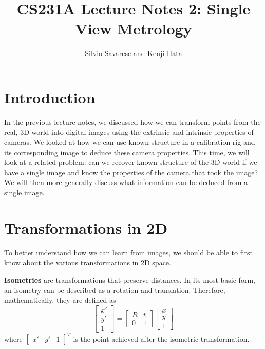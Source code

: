 \documentclass[a4paper, 12pt]{article}
\title{CS231A Lecture Notes 2: Single View Metrology}
\author{Silvio Savarese and Kenji Hata}
\date{}
\renewcommand\emph{\textbf}
\begin{document}
\maketitle

\section{Introduction}
In the previous lecture notes, we discussed how we can transform points from the real, 3D world into digital images using the extrinsic and intrinsic properties of cameras. We looked at how we can use known structure in a calibration rig and its corresponding image to deduce these camera properties. This time, we will look at a related problem: can we recover known structure of the 3D world if we have a single image and know the properties of the camera that took the image? We will then more generally discuss what information can be deduced from a single image.

\section{Transformations in 2D}
To better understand how we can learn from images, we should be able to first know about the various transformations in 2D space. 

\emph{Isometries} are transformations that preserve distances. In its most basic form, an isometry can be described as a rotation and translation. Therefore, mathematically, they are defined as
\begin{equation*}
    \begin{bmatrix}x'\\y'\\1\end{bmatrix} = \begin{bmatrix}R & t\\ 0 & 1\end{bmatrix}\begin{bmatrix}x\\y\\1\end{bmatrix}
\end{equation*}
where $\begin{bmatrix}x'&y'&1\end{bmatrix}^T$ is the point achieved after the isometric transformation. 
\end{document}
